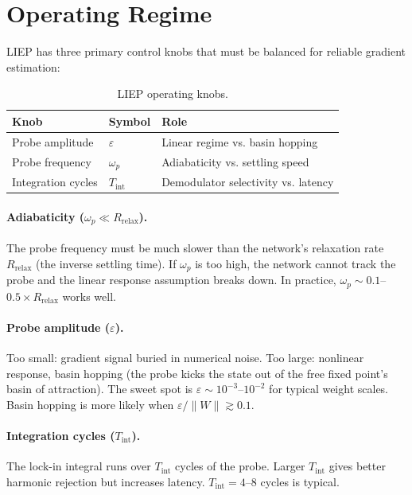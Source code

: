 \documentclass[11pt]{article}
\begin{document}
\section{Operating Regime}\label{sec:operating-regime}

LIEP has three primary control knobs that must be balanced for reliable gradient estimation:

\begin{table}[ht]
\centering
\caption{LIEP operating knobs.}
\label{tab:knobs}
\begin{tabular}{@{}lll@{}}
\toprule
Knob & Symbol & Role \\
\midrule
Probe amplitude & $\varepsilon$ & Linear regime vs. basin hopping \\
Probe frequency & $\omega_p$ & Adiabaticity vs. settling speed \\
Integration cycles & $T_{\text{int}}$ & Demodulator selectivity vs. latency \\
\bottomrule
\end{tabular}
\end{table}

\paragraph{Adiabaticity ($\omega_p \ll R_{\text{relax}}$).}
The probe frequency must be much slower than the network's relaxation rate $R_{\text{relax}}$ (the inverse settling time). If $\omega_p$ is too high, the network cannot track the probe and the linear response assumption breaks down. In practice, $\omega_p \sim 0.1$--$0.5 \times R_{\text{relax}}$ works well.

\paragraph{Probe amplitude ($\varepsilon$).}
Too small: gradient signal buried in numerical noise. Too large: nonlinear response, basin hopping (the probe kicks the state out of the free fixed point's basin of attraction). The sweet spot is $\varepsilon \sim 10^{-3}$--$10^{-2}$ for typical weight scales. Basin hopping is more likely when $\varepsilon / \|W\| \gtrsim 0.1$.

\paragraph{Integration cycles ($T_{\text{int}}$).}
The lock-in integral runs over $T_{\text{int}}$ cycles of the probe. Larger $T_{\text{int}}$ gives better harmonic rejection but increases latency. $T_{\text{int}} = 4$--$8$ cycles is typical.
\end{document}
